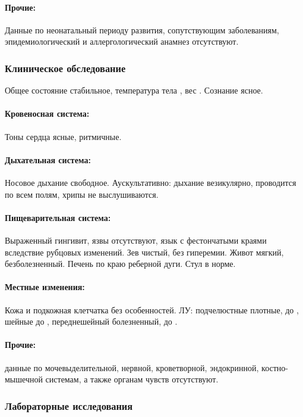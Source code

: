 \documentclass[a4paper,14pt]{extarticle}
\newcommand{\kilogramm}{кг}
\newcommand{\cm}{см}
\newcommand{\oCelsius}{\tcdegree{}C}
\begin{document}
\paragraph{Прочие:} Данные по неонатальный периоду развития, сопутствующим заболеваниям, эпидемиологический и аллергологический анамнез отсутствуют.

\subsubsection*{Клиническое обследование}

Общее состояние стабильное, температура тела \numprint[\oCelsius]{36.7}, вес \numprint[\kilogramm]{48}. Сознание ясное.

\paragraph{Кровеносная система:} Тоны сердца ясные, ритмичные.

\paragraph{Дыхательная система:} Носовое дыхание свободное. Аускультативно: дыхание везикулярно, проводится по всем полям, хрипы не выслушиваются.

\paragraph{Пищеварительная система:} Выраженный гингивит, язвы отсутствуют, язык с фестончатыми краями вследствие рубцовых изменений. Зев чистый, без гиперемии. Живот мягкий, безболезненный. Печень по краю реберной дуги. Стул в норме.

\paragraph{Местные изменения:} Кожа и подкожная клетчатка без особенностей. ЛУ: подчелюстные плотные, до \numprint[\cm]{1}, шейные до \numprint[\cm]{0.5}, переднешейный болезненный, до \numprint[\cm]{2}.

\paragraph{Прочие:} данные по мочевыделительной, нервной, кроветворной, эндокринной, костно-мышечной системам, а также органам чувств отсутствуют.

\subsubsection*{Лабораторные исследования}
\end{document}
